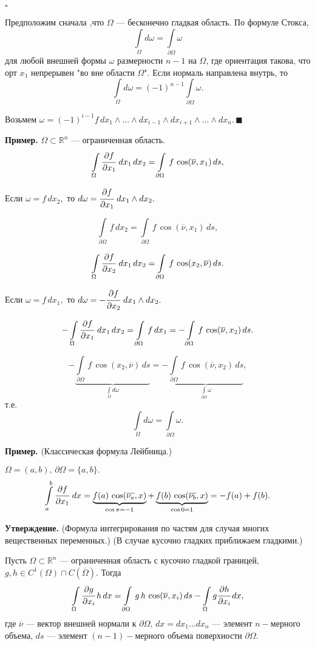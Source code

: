 \documentclass[unicode,12pt,draft]{article}
\begin{document}
$\square$

Предположим сначала ,что $\Omega$ --- бесконечно гладкая область.
По формуле Стокса,
$$\int\limits_{\Omega}d\omega=\int\limits_{\partial\Omega}\omega$$
для любой внешней формы $\omega$ размерности $n-1$ на $\Omega$,
где ориентация такова, что орт $x_1$ непрерывен "во вне области
$\Omega$". Если нормаль направлена внутрь, то
$$\int\limits_{\Omega}d\omega=(-1)^{n-1}\int\limits_{\partial\Omega}\omega.$$

Возьмем $\omega=(-1)^{i-1}f\,dx_1\wedge\ldots\wedge dx_{i-1}\wedge
dx_{i+1}\wedge\ldots\wedge dx_n.\,\blacksquare$

\textbf{Пример.} $\Omega\subset\mathbb R^n$ --- ограниченная
область.
$$\int\limits_{\Omega}\cfrac{\partial f}{\partial
x_1}\,\,dx_1\,dx_2=\int\limits_{\partial\Omega}\,f\,\cos(\overline{\nu},x_1)\,ds,$$

Если $\omega=f\,dx_2,$ то $d\omega=\cfrac{\partial f}{\partial
x_1}\,\,dx_1\wedge dx_2.$

$$\int\limits_{\partial\Omega}\,f\,dx_2=
\int\limits_{\partial\Omega}\,f\,\cos(\overline{\nu},x_1)\,ds,$$

$$\int\limits_{\Omega}\cfrac{\partial f}{\partial
x_2}\,\,dx_1\,dx_2=
\int\limits_{\partial\Omega}\,f\,\cos(x_2,\overline{\nu})\,ds.$$


Если $\omega=f\,dx_1,$ то $d\omega=-\cfrac{\partial f}{\partial
x_2}\,\,dx_1\wedge dx_2.$

$$-\int\limits_{\Omega}\cfrac{\partial f}{\partial
x_1}\,\,dx_1\,dx_2= \int\limits_{\partial\Omega}\,f\,dx_1=
-\int\limits_{\partial\Omega}\,f\,\cos(\overline{\nu},x_2)\,ds.$$

$$-\underbrace{\int\limits_{\partial\Omega}\,f\,\cos(x_2,\overline{\nu})\,ds}_
{\int\limits_{\Omega}d\omega}=
-\underbrace{\int\limits_{\partial\Omega}\,f\,\cos(\overline{\nu},x_2)\,ds}_
{\int\limits_{\partial\Omega}\omega},$$ т.е.
$$\int\limits_{\Omega}d\omega=\int\limits_{\partial\Omega}\omega.$$

\textbf{Пример.} (Классическая формула Лейбница.)

$\Omega=(a,b),\,\partial\Omega=\{a,b\}.$
$$\int\limits_a^b\cfrac{\partial f}{\partial
x_1}\,\,dx=
\underbrace{f(a)\,\cos(\overline{\nu_a},x)}_{\cos\pi=-1}+
\underbrace{f(b)\,\cos(\overline{\nu_b},x)}_{\cos
0=1}=-f(a)+f(b).$$

\textbf{Утверждение.} (Формула интегрирования по частям для случая
многих вещественных переменных.) (В случае кусочно гладких
приближаем гладкими.)

Пусть $\Omega\subset\mathbb R^n$ --- ограниченная область с
кусочно гладкой границей, $g,h\in C^1(\Omega)\cap
C(\overline{\Omega}).$ Тогда
$$\int\limits_{\Omega}\cfrac{\partial g}{\partial
x_i}\,h\,dx=\int\limits_{\partial\Omega}\,g\,h\,\cos(\overline{\nu},x_i)\,ds-
\int\limits_{\Omega}g\cfrac{\partial h}{\partial x_i}\,dx,$$ где
$\overline{\nu}$ --- вектор внешней нормали к
$\partial\Omega,\,dx=dx_1\ldots dx_n$ --- элемент $n-$мерного
объема, $ds$ --- элемент $(n-1)-$мерного объема поверхности
$\partial\Omega$.
\end{document}

